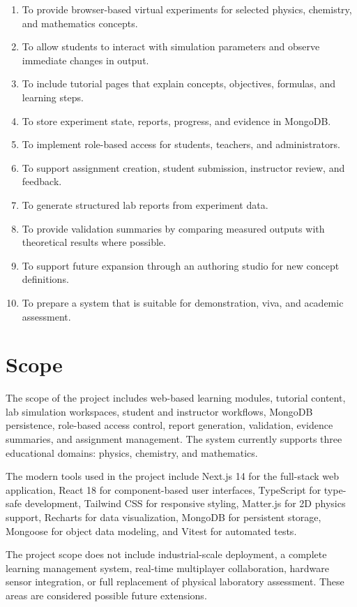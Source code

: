 \documentclass[12pt,a4paper]{report}
\begin{document}
\begin{enumerate}[label=\arabic*.]
\item To provide browser-based virtual experiments for selected physics, chemistry, and mathematics concepts.
\item To allow students to interact with simulation parameters and observe immediate changes in output.
\item To include tutorial pages that explain concepts, objectives, formulas, and learning steps.
\item To store experiment state, reports, progress, and evidence in MongoDB.
\item To implement role-based access for students, teachers, and administrators.
\item To support assignment creation, student submission, instructor review, and feedback.
\item To generate structured lab reports from experiment data.
\item To provide validation summaries by comparing measured outputs with theoretical results where possible.
\item To support future expansion through an authoring studio for new concept definitions.
\item To prepare a system that is suitable for demonstration, viva, and academic assessment.
\end{enumerate}

\section{Scope}
The scope of the project includes web-based learning modules, tutorial content, lab simulation workspaces, student and instructor workflows, MongoDB persistence, role-based access control, report generation, validation, evidence summaries, and assignment management. The system currently supports three educational domains: physics, chemistry, and mathematics.

The modern tools used in the project include Next.js 14 for the full-stack web application, React 18 for component-based user interfaces, TypeScript for type-safe development, Tailwind CSS for responsive styling, Matter.js for 2D physics support, Recharts for data visualization, MongoDB for persistent storage, Mongoose for object data modeling, and Vitest for automated tests.

The project scope does not include industrial-scale deployment, a complete learning management system, real-time multiplayer collaboration, hardware sensor integration, or full replacement of physical laboratory assessment. These areas are considered possible future extensions.
\end{document}
